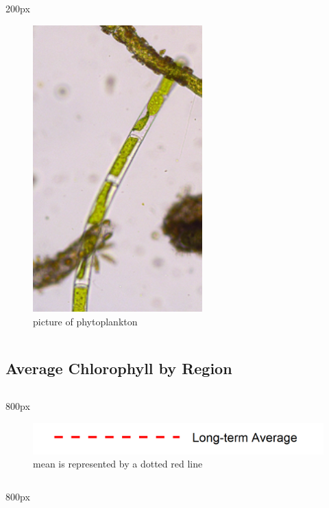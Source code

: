 \documentclass[
]{book}
\begin{document}
\begin{column}{200px\textwidth}
\begin{figure}

{\centering \includegraphics[width=2.57in]{figures/phyto} 

}

\caption{picture of phytoplankton}\label{fig:unnamed-chunk-61}
\end{figure}
\end{column}

\hypertarget{average-chlorophyll-by-region-1}{%
\subsection{Average Chlorophyll by Region}\label{average-chlorophyll-by-region-1}}

\begin{column}{800px\textwidth}
\begin{figure}
\includegraphics[width=15.25in]{figures/mline} \caption{mean is represented by a dotted red line}\label{fig:unnamed-chunk-62}
\end{figure}
\end{column}

\begin{column}{800px\textwidth}
\end{column}
\end{document}
